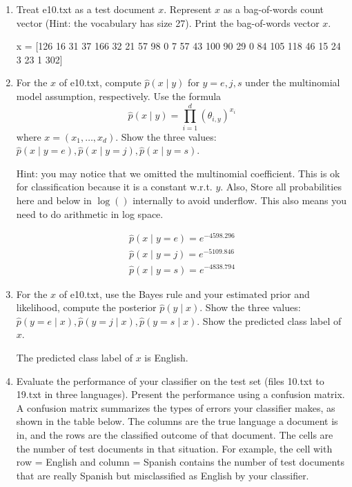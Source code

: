 \documentclass[10pt]{article}
\theoremstyle{definition}
\newenvironment{soln}{
    \leavevmode\color{blue}\ignorespaces
}{}
\begin{document}
\begin{enumerate}
    \item
          Treat e10.txt as a test document $x$.
          Represent $x$ as a bag-of-words count vector (Hint: the vocabulary has size 27).
          Print the bag-of-words vector $x$.

          \begin{soln}
              x = [126  16  31  37 166  32  21  57  98   0   7  57  43 100  90  29   0  84
              105 118  46  15  24   3  23   1 302]
          \end{soln}

    \item
          For the $x$ of e10.txt, compute $\hat p(x \mid y)$ for $y=e, j, s$ under the multinomial model assumption, respectively.
          Use the formula
          $$\hat p(x \mid y) = \prod_{i=1}^d (\theta_{i, y})^{x_i}$$
          where $x=(x_1, \ldots, x_d)$.
          Show the three values: $\hat p(x \mid y=e), \hat p(x \mid y=j), \hat p(x \mid y=s)$.

          Hint: you may notice that we omitted the multinomial coefficient.  This is ok for classification because it is a constant w.r.t. $y$. Also, Store all probabilities here and below in $\log()$ internally to avoid underflow. This also means you need to do arithmetic in log space.

          \begin{soln}
              \begin{align*}
                  \hat p(x \mid y=e) = e^{-4598.296} \\
                  \hat p(x \mid y=j) = e^{-5109.846} \\
                  \hat p(x \mid y=s) = e^{-4838.794}
              \end{align*}
          \end{soln}

    \item
          For the $x$ of e10.txt, use the Bayes rule and your estimated prior and likelihood, compute the posterior $\hat p(y \mid x)$.
          Show the three values: $\hat p(y=e \mid x), \hat p(y=j \mid x), \hat p(y=s \mid x)$.
          Show the predicted class label of $x$.

          \begin{soln}
              The predicted class label of $x$ is English.
          \end{soln}

    \item
          Evaluate the performance of your classifier on the test set (files 10.txt to 19.txt in three languages).
          Present the performance using a confusion matrix. A confusion matrix summarizes the types of errors your classifier makes, as shown in the table below.   The columns are the true language a document is in, and the rows are the classified outcome of that document.  The cells are the number of test documents in that situation.  For example, the cell with row = English and column = Spanish contains the number of test documents that are really Spanish but misclassified as English by your classifier.


\end{enumerate}
\end{document}
